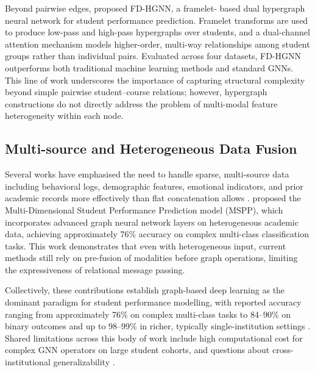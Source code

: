 \documentclass[sigconf]{acmart}
\begin{document}
Beyond pairwise edges, \citet{yang2024hypergraph} proposed FD-HGNN, a framelet-
based dual hypergraph neural network for student performance prediction.
Framelet transforms are used to produce low-pass and high-pass hypergraphs over
students, and a dual-channel attention mechanism models higher-order, multi-way
relationships among student groups rather than individual pairs. Evaluated across
four datasets, FD-HGNN outperforms both traditional machine learning methods and
standard GNNs. This line of work underscores the importance of capturing
structural complexity beyond simple pairwise student--course relations; however,
hypergraph constructions do not directly address the problem of multi-modal
feature heterogeneity within each node.

\subsection{Multi-source and Heterogeneous Data Fusion}

Several works have emphasised the need to handle sparse, multi-source data
including behavioral logs, demographic features, emotional indicators, and prior
academic records more effectively than flat concatenation allows
\citep{huang2024dual, zhang2025gnntinet, huang2024temporal, li2022studygnn,
yang2024hypergraph, balachandar2024mspp}. \citet{balachandar2024mspp} proposed
the Multi-Dimensional Student Performance Prediction model (MSPP), which
incorporates advanced graph neural network layers on heterogeneous academic data,
achieving approximately 76\% accuracy on complex multi-class classification tasks.
This work demonstrates that even with heterogeneous input, current methods still
rely on pre-fusion of modalities before graph operations, limiting the
expressiveness of relational message passing.

Collectively, these contributions establish graph-based deep learning as the
dominant paradigm for student performance modelling, with reported accuracy
ranging from approximately 76\% on complex multi-class tasks
\citep{balachandar2024mspp} to 84--90\% on binary outcomes \citep{huang2024dual}
and up to 98--99\% in richer, typically single-institution settings
\citep{zhang2025gnntinet}. Shared limitations across this body of work include
high computational cost for complex GNN operators on large student cohorts, and
questions about cross-institutional generalizability
\citep{huang2024dual, li2022studygnn, zhang2025gnntinet, huang2024temporal,
yang2024hypergraph, balachandar2024mspp}.
\end{document}
